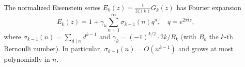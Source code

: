 The normalized Eisenstein series $E_k(z) = \frac{1}{2\zeta(k)} G_k(z)$ has Fourier expansion
$$
E_k(z) = 1 + \gamma_k \sum_{n=1}^\infty \sigma_{k-1}(n) q^n, \quad q = e^{2\pi i z},
$$
where $\sigma_{k-1}(n) = \sum_{d \mid n} d^{k-1}$ and $\gamma_k = (-1)^{k/2} \cdot 2k/B_k$ (with $B_k$ the $k$-th Bernoulli number). In particular, $\sigma_{k-1}(n) = O(n^{k-1})$ and grows at most polynomially in $n$.
